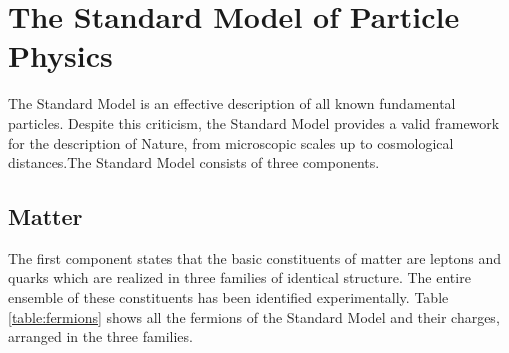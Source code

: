 \section{The Standard Model of Particle Physics}

The Standard Model \cite{Spiesberger:2000ks} is an effective description of all known fundamental particles.  Despite this criticism, the Standard Model provides a valid framework for the description of Nature, from microscopic scales up to cosmological distances.The Standard Model consists of three components.

\subsection{Matter}

The first component states that the basic constituents of matter are leptons and quarks which are realized in three families of identical structure. The entire ensemble of these constituents has been identified experimentally. Table \ref{table:fermions} shows all the fermions of the Standard Model and their charges, arranged in the three families.

